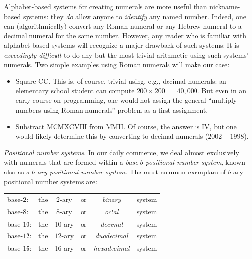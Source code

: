 \medskip

Alphabet-based systems for creating numerals are more useful than
nickname-based systems: they {\em do} allow anyone to {\em identify}
any named number. Indeed, one can (algorithmically) convert any Roman
numeral or any Hebrew numeral to a decimal numeral for the same
number.  However, any reader who is familiar with alphabet-based
systems will recognize a major drawback of such systems: It is {\em
  exceedingly difficult} to do any but the most trivial arithmetic
using such systems' numerals.  Two simple examples using Roman
numerals will make our case:
\begin{itemize}
\item
Square CC.  This is, of course, trivial using, e.g., decimal numerals:
an elementary school student can compute $200 \times 200 \ =
\ 40,000$.  But even in an early course on programming, one would not
assign the general ``multiply numbers using Roman numerals'' problem
as a first assignment.

\item
Substract MCMXCVIII from MMII.  Of course, the answer is IV, but one
would likely determine this by converting to decimal numerals
($2002-1998$).
\end{itemize}

\noindent
{\it Positional number systems.}
%
In our daily commerce, we deal almost exclusively with numerals that
are formed within a {\it base-$b$ positional number system},
 known also as
a {\it $b$-ary positional number system}.
The most common exemplars of $b$-ary positional number systems are:

\smallskip

\begin{tabular}{llclcl}
base-$2$:  & the & $2$-ary  & or & {\em binary}      & system \\
base-$8$:  & the & $8$-ary  & or & {\em octal}       & system \\
base-$10$: & the & $10$-ary & or & {\em decimal}     & system \\
base-$12$: & the & $12$-ary & or & {\em duodecimal}  & system \\
base-$16$: & the & $16$-ary & or & {\em hexadecimal} & system
\end{tabular}

\smallskip

